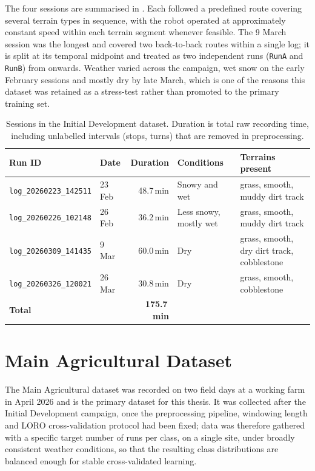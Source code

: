 The four sessions are summarised in . Each followed a predefined route covering several terrain types in sequence, with the robot operated at approximately constant speed within each terrain segment whenever feasible. The 9 March session was the longest and covered two back-to-back routes within a single log; it is split at its temporal midpoint and treated as two independent runs (\texttt{RunA} and \texttt{RunB}) from  onwards. Weather varied across the campaign, wet snow on the early February sessions and mostly dry by late March, which is one of the reasons this dataset was retained as a stress-test rather than promoted to the primary training set.

\begin{table}[H]
\centering
\caption{Sessions in the Initial Development dataset. Duration is total raw recording time, including unlabelled intervals (stops, turns) that are removed in preprocessing.}
\label{tab:main_sessions}
\begin{tabular}{llrp{4.0cm}p{3.0cm}}
\toprule
\textbf{Run ID} & \textbf{Date} & \textbf{Duration} & \textbf{Conditions} & \textbf{Terrains present} \\
\midrule
\texttt{log\_20260223\_142511} & 23 Feb & 48.7\,min & Snowy and wet & grass, smooth, muddy dirt track \\
\texttt{log\_20260226\_102148} & 26 Feb & 36.2\,min & Less snowy, mostly wet & grass, smooth, muddy dirt track \\
\texttt{log\_20260309\_141435} &  9 Mar & 60.0\,min & Dry & grass, smooth, dry dirt track, cobblestone \\
\texttt{log\_20260326\_120021} & 26 Mar & 30.8\,min & Dry & grass, smooth, cobblestone \\
\midrule
\multicolumn{2}{l}{\textbf{Total}} & \textbf{175.7\,min} & & \\
\bottomrule
\end{tabular}
\end{table}



\section{Main Agricultural Dataset}
\label{sec:farm_dataset}

The Main Agricultural dataset was recorded on two field days at a working farm in April 2026 and is the primary dataset for this thesis. It was collected after the Initial Development campaign, once the preprocessing pipeline, windowing length and LORO cross-validation protocol had been fixed; data was therefore gathered with a specific target number of runs per class, on a single site, under broadly consistent weather conditions, so that the resulting class distributions are balanced enough for stable cross-validated learning.

